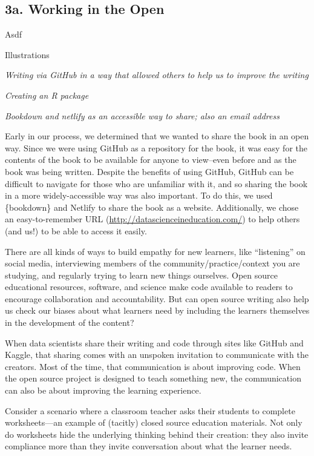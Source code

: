 \documentclass[
  english,
  man]{apa6}
\begin{document}
\hypertarget{a.-working-in-the-open}{%
\subsection{3a. Working in the Open}\label{a.-working-in-the-open}}

Asdf

Illustrations

\emph{Writing via GitHub in a way that allowed others to help us to improve the writing}

\emph{Creating an R package}

\emph{Bookdown and netlify as an accessible way to share; also an email address}

Early in our process, we determined that we wanted to share the book in an open way. Since we were using GitHub as a repository for the book, it was easy for the contents of the book to be available for anyone to view--even before and as the book was being written. Despite the benefits of using GitHub, GitHub can be difficult to navigate for those who are unfamiliar with it, and so sharing the book in a more widely-accessible way was also important. To do this, we used \{bookdown\} and Netlify to share the book as a website. Additionally, we chose an easy-to-remember URL (\url{http://datascienceineducation.com/}) to help others (and us!) to be able to access it easily.

There are all kinds of ways to build empathy for new learners, like ``listening'' on social media, interviewing members of the community/practice/context you are studying, and regularly trying to learn new things ourselves. Open source educational resources, software, and science make code available to readers to encourage collaboration and accountability. But can open source writing also help us check our biases about what learners need by including the learners themselves in the development of the content?

When data scientists share their writing and code through sites like GitHub and Kaggle, that sharing comes with an unspoken invitation to communicate with the creators. Most of the time, that communication is about improving code. When the open source project is designed to teach something new, the communication can also be about improving the learning experience.

Consider a scenario where a classroom teacher asks their students to complete worksheets---an example of (tacitly) closed source education materials. Not only do worksheets hide the underlying thinking behind their creation: they also invite compliance more than they invite conversation about what the learner needs.
\end{document}
